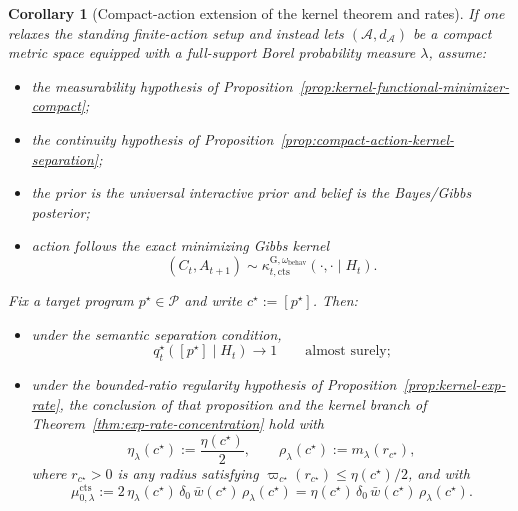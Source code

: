 \documentclass[11pt]{article}
\newtheorem{corollary}[theorem]{Corollary}
\theoremstyle{definition}
\theoremstyle{remark}
\newcommand{\Acal}{\mathcal{A}}
\newcommand{\Pcal}{\mathcal{P}}
\begin{document}
\begin{corollary}[Compact-action extension of the kernel theorem and rates]
\label{cor:compact-action-kernel}
If one relaxes the standing finite-action setup and instead lets $(\Acal,d_\Acal)$ be a compact metric space equipped with a full-support Borel probability measure $\lambda$, assume:
\begin{itemize}
\item[(i)] the measurability hypothesis of Proposition~\ref{prop:kernel-functional-minimizer-compact};
\item[(ii)] the continuity hypothesis of Proposition~\ref{prop:compact-action-kernel-separation};
\item[(iii)] the prior is the universal interactive prior and belief is the Bayes/Gibbs posterior;
\item[(iv)] action follows the exact minimizing Gibbs kernel
\[
(C_t,A_{t+1})\sim \kappa_{t,\mathrm{cts}}^{\mathrm G,\omega_{\mathrm{behav}}}(\cdot,\cdot\mid H_t).
\]
\end{itemize}
Fix a target program $p^\star\in\Pcal$ and write $c^\star:=[p^\star]$. Then:
\begin{itemize}
\item[(a)] under the semantic separation condition,
\[
q_t^\star([p^\star]\mid H_t)\longrightarrow 1
\qquad\text{almost surely;}
\]
\item[(b)] under the bounded-ratio regularity hypothesis of Proposition~\ref{prop:kernel-exp-rate}, the conclusion of that proposition and the kernel branch of Theorem~\ref{thm:exp-rate-concentration} hold with
\[
\eta_\lambda(c^\star):=\frac{\eta(c^\star)}{2},
\qquad
\rho_\lambda(c^\star):=m_\lambda(r_{c^\star}),
\]
where $r_{c^\star}>0$ is any radius satisfying $\varpi_{c^\star}(r_{c^\star})\le \eta(c^\star)/2$, and with
\[
\mu_{0,\lambda}^{\mathrm{cts}}
:=
2\,\eta_\lambda(c^\star)\,\delta_0\,\bar w(c^\star)\,\rho_\lambda(c^\star)
=
\eta(c^\star)\,\delta_0\,\bar w(c^\star)\,\rho_\lambda(c^\star).
\]
\end{itemize}
\end{corollary}
\end{document}
